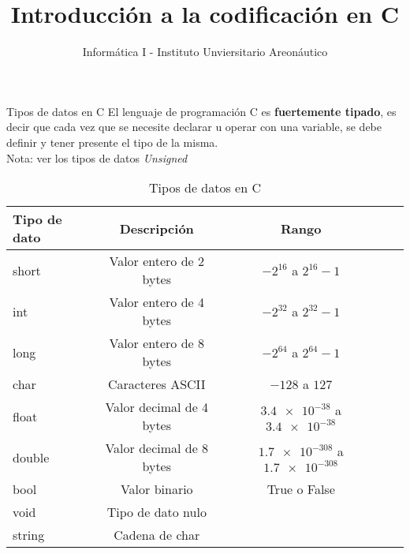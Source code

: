 \documentclass[xcolor=pdftex,table,11pt]{beamer}
\author{Informática I - Instituto Unviersitario Areonáutico}
\title{Introducción a la codificación en C}
\begin{document}
\begin{frame}
\titlepage
\end{frame}

\begin{frame}
\tableofcontents
\end{frame}

\begin{frame} {Tipos de datos en C}
El lenguaje de programación C es \textbf{fuertemente tipado}, es decir que cada vez que se necesite declarar u operar con una variable, se debe definir y tener presente el tipo de la misma. \\
Nota: ver los tipos de datos \textit{Unsigned}
\begin{table}
\begin{tabular}{l | c | c | c | l }
Tipo de dato & Descripción & Rango  \\
\hline \hline
short & Valor entero de 2 bytes & $-2^{16}$ a $2^{16} -1 $\\ 
int & 	Valor entero de 4 bytes & $-2^{32}$ a $2^{32} -1 $\\ 
long & 	Valor entero de 8 bytes & $-2^{64}$ a $2^{64} -1 $\\ 
char & Caracteres ASCII & $-128 $ a $127$\\ 
float & Valor decimal de 4 bytes & $\num{3.4e-38} $ a $\num{3.4e-38}$\\ 
double & Valor decimal de 8 bytes & $\num{1.7e-308} $ a $\num{1.7e-308}$\\ 
bool & Valor binario &True o False\\ 
void & Tipo de dato nulo &\\ 
 string & Cadena de char  &\\ 
\end{tabular}
\caption{Tipos de datos en C}

\end{table}

\end{frame}
\end{document}
